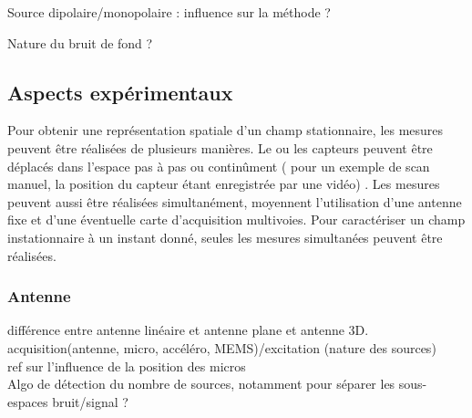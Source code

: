 Source dipolaire/monopolaire : influence sur la méthode ?

Nature du bruit de fond ?


\subsection{Aspects expérimentaux}
Pour obtenir une représentation spatiale d'un champ stationnaire, les mesures peuvent être réalisées de plusieurs manières. Le ou les capteurs peuvent être déplacés dans l'espace pas à pas ou continûment (\cite{Comesana2013} pour un exemple de scan manuel, la position du capteur étant enregistrée par une vidéo) . Les mesures peuvent aussi être réalisées simultanément, moyennent l'utilisation d'une antenne fixe et d'une éventuelle carte d'acquisition multivoies. Pour caractériser un champ instationnaire à un instant donné, seules les mesures simultanées peuvent être réalisées.

\subsubsection{Antenne}
différence entre antenne linéaire et antenne plane et antenne 3D.\\

acquisition(antenne, micro, accéléro, MEMS)/excitation (nature des sources)\\

ref sur l'influence de la position des micros\\



Algo de détection du nombre de sources, notamment pour séparer les sous-espaces bruit/signal ?

